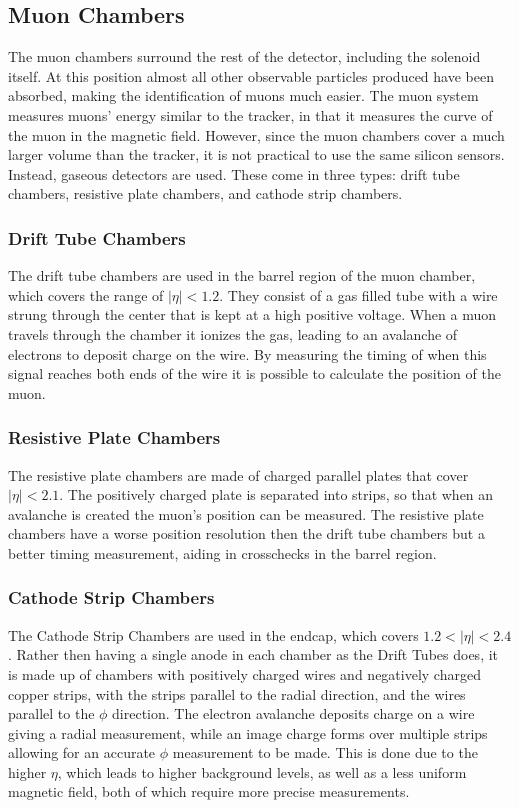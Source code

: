 \subsection{Muon Chambers}
The muon chambers surround the rest of the detector, including the solenoid itself. At this position almost all other observable particles produced have been absorbed, making the identification of muons much easier. The muon system  measures muons' energy similar to the tracker, in that it measures the curve of the muon in the magnetic field. However, since the muon chambers cover a much larger volume than the tracker, it is not practical to use the same silicon sensors. Instead, gaseous detectors are used. These come in three types: drift tube chambers, resistive plate chambers, and cathode strip chambers.
\subsubsection{Drift Tube Chambers}
The drift tube chambers are used in the barrel region of the muon chamber, which covers the range of $|\eta|<1.2$. They consist of a gas filled tube with a wire strung through the center that is kept at a high positive voltage.  When a muon travels through the chamber it ionizes the gas, leading to an avalanche of electrons to deposit charge on the wire. By measuring the timing of when this signal reaches both ends of the wire it is possible to calculate the position of the muon.

\subsubsection{Resistive Plate Chambers}
The resistive plate chambers are made of charged parallel plates that cover $|\eta|<2.1$. The positively charged plate is separated into strips, so that when an avalanche is created the muon's position can be measured. The resistive plate chambers have a worse position resolution then the drift tube chambers but a better timing measurement, aiding in crosschecks in the barrel region. 

\subsubsection{Cathode Strip Chambers}
The Cathode Strip Chambers are used in the endcap, which covers $1.2<|\eta|<2.4$. Rather then having a single anode in each chamber as the Drift Tubes does, it is made up of chambers with positively charged wires and negatively charged copper strips, with the strips parallel to the radial direction, and the wires parallel to the $\phi$ direction. The electron avalanche deposits charge on a wire giving a radial measurement, while an image charge forms over multiple strips allowing for an accurate $\phi$ measurement to be made.  This is done due to the higher $\eta$, which leads to higher background levels, as well as a less uniform magnetic field, both of which require more precise measurements. 

